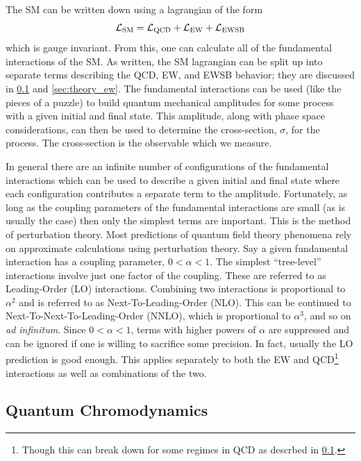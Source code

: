 The SM can be written down using a lagrangian of the form
\begin{equation}
\mathcal{L}_{\textrm{SM}} = \mathcal{L}_{\textrm{QCD}} + \mathcal{L}_{\textrm{EW}} + \mathcal{L}_{\textrm{EWSB}}
\label{eq:lagrangian_sm}
\end{equation}
which is gauge invariant.
From this, one can calculate all of the fundamental interactions of the SM.
As written, the SM lagrangian can be split up into separate terms describing the
QCD, EW, and EWSB behavior; they are discussed in \sec\ref{sec:theory_qcd} and
\sec\ref{sec:theory_ew}.
The fundamental interactions can be used (like the pieces of a puzzle)
to build quantum mechanical amplitudes for some process 
with a given initial and final state. 
This amplitude, along with phase space considerations, can then be used
to determine the cross-section, $\sigma$, for the process. The cross-section
is the observable which we measure.


In general there are an infinite number of configurations of the fundamental
interactions which can be used to describe a given initial and final state where
each configuration contributes a separate term to the amplitude. 
Fortunately,
as long as the coupling parameters of the fundamental interactions are small
(as is usually the case) then only the simplest terms are important.
This is the method of perturbation theory.  
Most predictions of quantum field theory phenomena rely on approximate calculations
using perturbation theory. Say a given fundamental interaction has a coupling 
parameter, $0 < \alpha < 1$. The simplest ``tree-level'' interactions
involve just one factor of the coupling. 
These are referred to as 
Leading-Order (LO) interactions.
Combining two interactions 
is proportional to $\alpha^2$ and is referred to as Next-To-Leading-Order (NLO).
This can be continued to Next-To-Next-To-Leading-Order (NNLO), which is 
proportional to $\alpha^3$, and so on \emph{ad infinitum}.
Since $0 < \alpha < 1$, terms with higher powers of $\alpha$ are suppressed
and can be ignored if one is willing to sacrifice some precision. In fact,
usually the LO prediction is good enough. This applies separately to 
both the EW and QCD\footnote{Though this can break down for some
regimes in QCD as descrbed in \sec\ref{sec:theory_qcd}.}
interactions as well as combinations of the two. 



\subsection{Quantum Chromodynamics}
\label{sec:theory_qcd}

